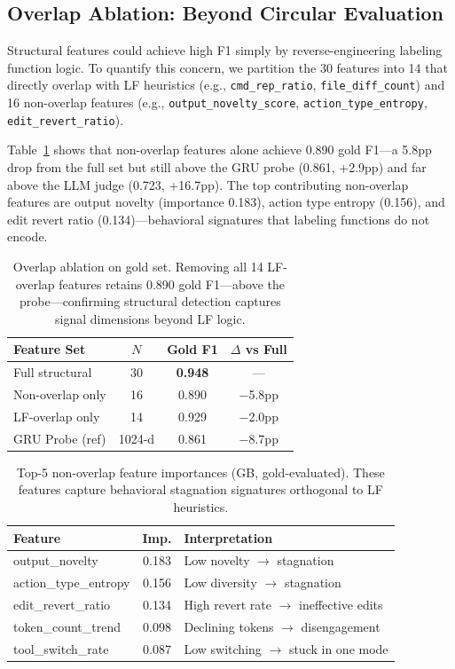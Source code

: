 \documentclass[11pt,a4paper]{article}
\begin{document}
\subsection{Overlap Ablation: Beyond Circular Evaluation}
\label{sec:ablation}

Structural features could achieve high F1 simply by reverse-engineering labeling function logic.
To quantify this concern, we partition the 30 features into 14 that directly overlap with LF heuristics (e.g., \texttt{cmd\_rep\_ratio}, \texttt{file\_diff\_count}) and 16 non-overlap features (e.g., \texttt{output\_novelty\_score}, \texttt{action\_type\_entropy}, \texttt{edit\_revert\_ratio}).

Table~\ref{tab:ablation} shows that non-overlap features alone achieve 0.890 gold F1---a 5.8pp drop from the full set but still above the GRU probe (0.861, +2.9pp) and far above the LLM judge (0.723, +16.7pp).
The top contributing non-overlap features are output novelty (importance 0.183), action type entropy (0.156), and edit revert ratio (0.134)---behavioral signatures that labeling functions do not encode.

\begin{table}[t]
\centering
\small
\begin{tabular}{lccc}
\toprule
\textbf{Feature Set} & \textbf{$N$} & \textbf{Gold F1} & \textbf{$\Delta$ vs Full} \\
\midrule
Full structural       & 30     & \textbf{0.948} & --- \\
Non-overlap only      & 16     & 0.890 & $-$5.8pp \\
LF-overlap only       & 14     & 0.929 & $-$2.0pp \\
GRU Probe (ref)       & 1024-d & 0.861 & $-$8.7pp \\
\bottomrule
\end{tabular}
\caption{Overlap ablation on gold set. Removing all 14 LF-overlap features retains 0.890 gold F1---above the probe---confirming structural detection captures signal dimensions beyond LF logic.}
\label{tab:ablation}
\end{table}

\begin{table}[t]
\centering
\small
\begin{tabular}{lcp{4.5cm}}
\toprule
\textbf{Feature} & \textbf{Imp.} & \textbf{Interpretation} \\
\midrule
output\_novelty       & 0.183 & Low novelty $\to$ stagnation \\
action\_type\_entropy & 0.156 & Low diversity $\to$ stagnation \\
edit\_revert\_ratio   & 0.134 & High revert rate $\to$ ineffective edits \\
token\_count\_trend   & 0.098 & Declining tokens $\to$ disengagement \\
tool\_switch\_rate    & 0.087 & Low switching $\to$ stuck in one mode \\
\bottomrule
\end{tabular}
\caption{Top-5 non-overlap feature importances (GB, gold-evaluated). These features capture behavioral stagnation signatures orthogonal to LF heuristics.}
\label{tab:feature-importance}
\end{table}
\end{document}
